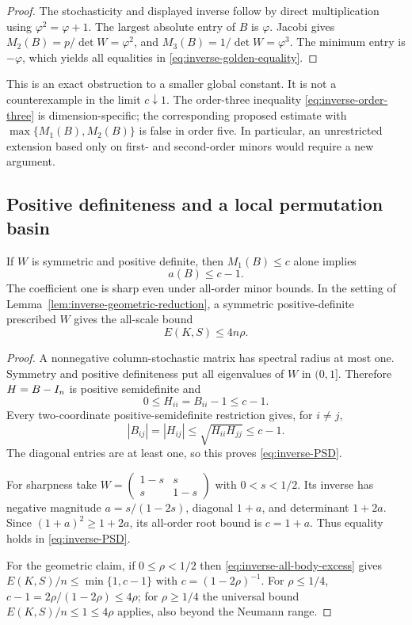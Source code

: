 \begin{proof}
The stochasticity and displayed inverse follow by direct
multiplication using $\varphi^2=\varphi+1$.  The largest absolute
entry of $B$ is $\varphi$.  Jacobi gives
$M_2(B)=p/\det W=\varphi^2$, and
$M_3(B)=1/\det W=\varphi^3$.  The minimum entry is $-\varphi$,
which yields all equalities in \eqref{eq:inverse-golden-equality}.
\end{proof}

This is an exact obstruction to a smaller global constant.  It is
not a counterexample in the limit $c\downarrow1$.  The order-three
inequality \eqref{eq:inverse-order-three} is dimension-specific;
the corresponding proposed estimate with
$\max\{M_1(B),M_2(B)\}$ is false in order five.  In particular, an
unrestricted extension based only on first- and second-order minors
would require a new argument.

\subsection{Positive definiteness and a local permutation basin}

\begin{theorem}
\label{thm:inverse-positive-definite}
If $W$ is symmetric and positive definite, then $M_1(B)\leq c$
alone implies
\begin{equation}
 a(B)\leq c-1.
 \label{eq:inverse-PSD}
\end{equation}
The coefficient one is sharp even under all-order minor bounds.
In the setting of Lemma~\ref{lem:inverse-geometric-reduction}, a
symmetric positive-definite prescribed $W$ gives the all-scale bound
\begin{equation}
 E(K,S)\leq4n\rho.
 \label{eq:inverse-PSD-geometric}
\end{equation}
\end{theorem}

\begin{proof}
A nonnegative column-stochastic matrix has spectral radius at most
one.  Symmetry and positive definiteness put all eigenvalues of $W$
in $(0,1]$.  Therefore $H=B-I_n$ is positive semidefinite and
\[
 0\leq H_{ii}=B_{ii}-1\leq c-1.
\]
Every two-coordinate positive-semidefinite restriction gives, for
$i\ne j$,
\[
 |B_{ij}|=|H_{ij}|\leq\sqrt{H_{ii}H_{jj}}\leq c-1.
\]
The diagonal entries are at least one, so this proves
\eqref{eq:inverse-PSD}.

For sharpness take
$W=\left(\begin{smallmatrix}1-s&s\\s&1-s\end{smallmatrix}\right)$
with $0<s<1/2$.  Its inverse has negative magnitude
$a=s/(1-2s)$, diagonal $1+a$, and determinant $1+2a$.
Since $(1+a)^2\geq1+2a$, its all-order root bound is $c=1+a$.
Thus equality holds in \eqref{eq:inverse-PSD}.

For the geometric claim, if $0\leq\rho<1/2$ then
\eqref{eq:inverse-all-body-excess} gives
$E(K,S)/n\leq\min\{1,c-1\}$ with $c=(1-2\rho)^{-1}$.
For $\rho\leq1/4$,
$c-1=2\rho/(1-2\rho)\leq4\rho$; for $\rho\geq1/4$ the
universal bound $E(K,S)/n\leq1\leq4\rho$ applies, also beyond
the Neumann range.
\end{proof}

